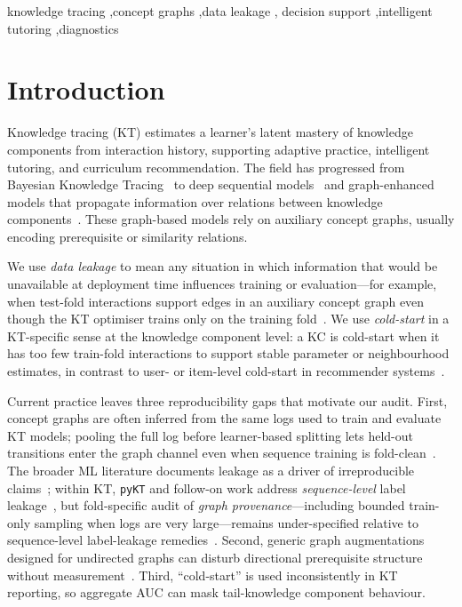 \documentclass[preprint,10pt,doubleblind]{elsarticle}
\newcommand{\KC}{knowledge component}
\newcommand{\KCs}{knowledge components}
\begin{document}
\begin{frontmatter}
\begin{keyword}
knowledge tracing \sep concept graphs \sep data leakage \sep
decision support \sep intelligent tutoring \sep diagnostics
\end{keyword}
\end{frontmatter}

\section{Introduction}
\label{sec:intro}
Knowledge tracing (KT) estimates a learner's latent mastery of
\KCs{} from interaction history, supporting adaptive practice,
intelligent tutoring, and curriculum recommendation. The field has
progressed from Bayesian Knowledge Tracing~\cite{corbett1995bkt} to
deep sequential models~\cite{piech2015dkt,zhang2017dkvmn,ghosh2020akt,liu2023simplekt,pandey2019rkt,shen2021saint} and graph-enhanced models
that propagate information over relations between
\KCs{}~\cite{nakagawa2019gkt,tong2020skt,yang2021gikt,dygkt2024,dgekt2024,chen2023hgkt}. These graph-based models rely on
auxiliary concept graphs, usually encoding prerequisite or similarity
relations.

We use \emph{data leakage} to mean any situation in which information
that would be unavailable at deployment time influences training or
evaluation---for example, when test-fold interactions support edges in
an auxiliary concept graph even though the KT optimiser trains only on
the training fold~\cite{kaufman2012leakage,kapoor2023leakage}. We use
\emph{cold-start} in a KT-specific sense at the \KC{} level: a KC is
cold-start when it has too few train-fold interactions to support stable
parameter or neighbourhood estimates, in contrast to user- or item-level
cold-start in recommender systems~\cite{schein2002coldstart}.

Current practice leaves three reproducibility gaps that motivate our
audit. First, concept graphs are often inferred from the same logs used
to train and evaluate KT models; pooling the full log before
learner-based splitting lets held-out transitions enter the graph
channel even when sequence training is fold-clean~\cite{nakagawa2019gkt,tong2020skt,liu2022pykt}.
The broader ML literature documents leakage as a driver of irreproducible
claims~\cite{kaufman2012leakage,kapoor2023leakage}; within KT,
\texttt{pyKT} and follow-on work address \emph{sequence-level} label
leakage~\cite{liu2022pykt,badran2024labelleakage}, but fold-specific
audit of \emph{graph provenance}---including bounded train-only sampling
when logs are very large---remains under-specified relative to sequence-level
label-leakage remedies~\cite{badran2024labelleakage}. Second, generic graph
augmentations designed for undirected graphs can disturb directional
prerequisite structure without measurement~\cite{you2020graphcl,zhu2021gca}.
Third, ``cold-start'' is used inconsistently in KT reporting, so
aggregate AUC can mask tail-\KC{} behaviour.
\end{document}
